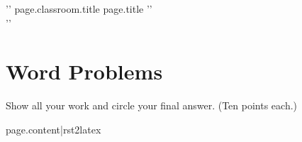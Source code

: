 \documentclass{article}
\begin{document}
\setcounter{page}{1}


\begin{center}
\LARGE{{ '{' }}{{ page.classroom.title }} {{ page.title }}{{ '}' }} \\[2mm]
\small{{ '{' }}}
\end{center}

\thispagestyle{empty}

\section*{Word Problems}
Show all your work and circle your final answer. (Ten points each.) \par

{{ page.content|rst2latex }}
\end{document}
